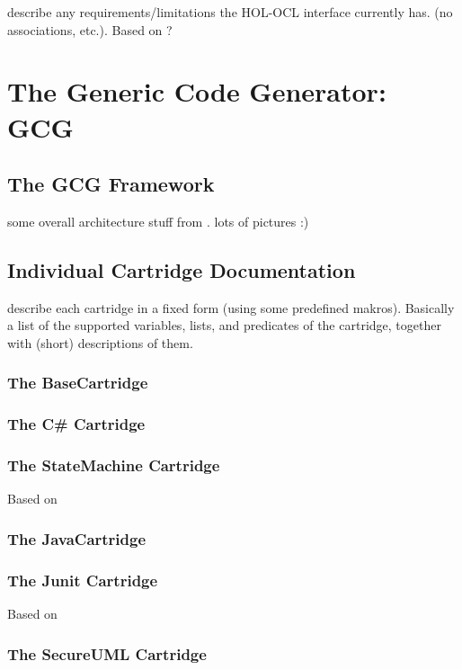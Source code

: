 \documentclass[bibtotoc,liststotoc]{scrbook}
\begin{document}
describe any requirements/limitations the HOL-OCL interface currently
has. (no associations, etc.). Based on
\cite{brucker.ea:hol-ocl-book:2006}? 

\chapter{The Generic Code Generator: GCG}

\section{The GCG Framework}

some overall architecture stuff from
\cite{eidenbenz:development:2006}. lots of 
pictures :)  

\section{Individual Cartridge Documentation}

describe each cartridge in a fixed form (using some predefined
makros). Basically a list of the supported variables, lists, and
predicates of the cartridge, together with (short) descriptions of
them. 

\subsection{The BaseCartridge}

\subsection{The C\# Cartridge}

\subsection{The StateMachine Cartridge}
Based on \cite{adelsberger:development:2006}

\subsection{The JavaCartridge}

\subsection{The Junit Cartridge}

Based on \cite{stock:automatic:2007}

\subsection{The SecureUML Cartridge}
\end{document}
